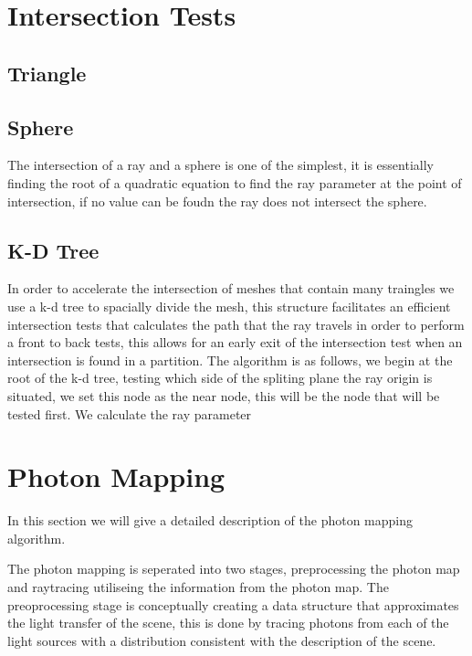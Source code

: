 
\section{Intersection Tests}
\subsection{Triangle}
\subsection{Sphere}
The intersection of a ray and a sphere is one of the simplest, it is essentially finding the root of a quadratic equation to
find the ray parameter at the point of intersection, if no value can be foudn the ray does not intersect the sphere.
\subsection{K-D Tree}
In order to accelerate the intersection of meshes that contain many traingles we use a k-d tree to spacially divide the mesh,
this structure facilitates an efficient intersection tests that calculates the path that the ray travels in order to perform
a front to back tests, this allows for an early exit of the intersection test when an intersection is found in a partition.
The algorithm is as follows, we begin at the root of the k-d tree, testing which side of the spliting plane the ray origin
is situated, we set this node as the near node, this will be the node that will be tested first. We calculate the ray parameter


\section{Photon Mapping}
In this section we will give a detailed description of the photon mapping algorithm.

The photon mapping is seperated into two stages, preprocessing the photon map and raytracing utiliseing the information from the photon
map. The preoprocessing stage is conceptually creating a data structure that approximates the light transfer of the scene, this is done
by tracing photons from each of the light sources with a distribution consistent with the description of the scene.

